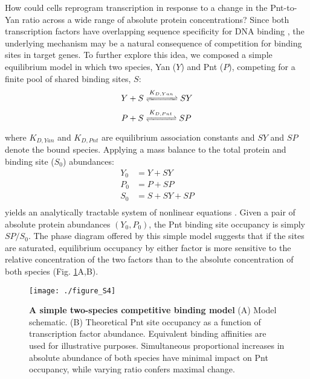 How could cells reprogram transcription in response to a change in the Pnt-to-Yan ratio across a wide range of absolute protein concentrations? Since both transcription factors have overlapping sequence specificity for DNA binding \cite{Xu2000,Halfon2000,Flores2000,Wei2010,Webber2013,Webber2013a,Nitta2015}, the underlying mechanism may be a natural consequence of competition for binding sites in target genes. To further explore this idea, we composed a simple equilibrium model in which two species, Yan ($Y$) and Pnt ($P$), competing for a finite pool of shared binding sites, $S$:
\begin{equation}
\begin{aligned}
Y + S &\xrightleftharpoons{\,K_{D,Yan}\,} SY \\
P + S &\xrightleftharpoons{\,K_{D,Pnt}\,} SP \\
\end{aligned}
\end{equation}
where $K_{D,Yan}$ and $K_{D,Pnt}$ are equilibrium association constants and $SY$ and $SP$ denote the bound species. Applying a mass balance to the total protein and binding site ($S_0$) abundances:
\begin{equation}
\begin{aligned}
Y_0 &= Y + SY \\
P_0 &= P + SP \\
S_0 &= S + SY + SP \\
\end{aligned}
\end{equation}
yields an analytically tractable system of nonlinear equations \cite{Wang1995}. Given a pair of absolute protein abundances $(Y_0,P_0)$, the Pnt binding site occupancy is simply $SP/S_0$. The phase diagram offered by this simple model suggests that if the sites are saturated, equilibrium occupancy by either factor is more sensitive to the relative concentration of the two factors than to the absolute concentration of both species (Fig. \ref{fig:ratio:figS4}A,B).

\begin{figure}[h]
\centering
\texttt{[image: ./figure\_S4]}
\caption[Simple two-species competitive binding model]{\textbf{A simple two-species competitive binding model} (A) Model schematic. (B) Theoretical Pnt site occupancy as a function of transcription factor abundance. Equivalent binding affinities are used for illustrative purposes. Simultaneous proportional increases in absolute abundance of both species have minimal impact on Pnt occupancy, while varying ratio confers maximal change.}
\label{fig:ratio:figS4}
\end{figure}

